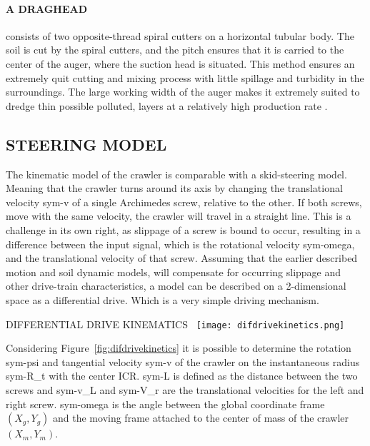 \paragraph{A DRAGHEAD} consists of two opposite-thread spiral cutters on a horizontal tubular body. The soil is cut by
the spiral cutters, and the pitch ensures that it is carried to the center of the auger, where the suction head is
situated. This method ensures an extremely quit cutting and mixing process with little spillage and turbidity in the
surroundings. The large working width of the auger makes it extremely suited to dredge thin possible polluted, layers at
a relatively high production rate \cite{van_der_schrieck_dredging_2014}.





\subsection{STEERING MODEL}

The kinematic model of the crawler is comparable with a skid-steering model. Meaning that the crawler turns around its
axis by changing the translational velocity \gls{sym-v} of a single Archimedes screw, relative to the other. If both
screws, move with the same velocity, the crawler will travel in a straight line. This is a challenge in its own right,
as slippage of a screw is bound to occur, resulting in a difference between the input signal, which is the rotational
velocity \gls{sym-omega}, and the translational velocity of that screw. Assuming that the earlier described motion and
soil dynamic models, will compensate for occurring slippage and other drive-train characteristics, a model can be
described on a 2-dimensional space as a differential drive. Which is a very simple driving mechanism.

\begin{RoyalFigure}[!htb, label=fig:difdrivekinetics]{DIFFERENTIAL DRIVE KINEMATICS~\cite{klancar_wheeled_2017}}
	\texttt{[image: difdrivekinetics.png]}
\end{RoyalFigure}

Considering Figure~\ref{fig:difdrivekinetics} it is possible to determine the rotation \gls{sym-psi} and tangential
velocity \gls{sym-v} of the crawler on the instantaneous radius \gls{sym-R_t} with the center ICR. \gls{sym-L} is
defined as the distance between the two screws and \gls{sym-v_L} and \gls{sym-V_r} are the translational velocities for
the left and right screw. \gls{sym-omega} is the angle between the global coordinate frame \( (X_g, Y_g) \) and the
moving frame attached to the center of mass of the crawler \( (X_m, Y_m) \).

